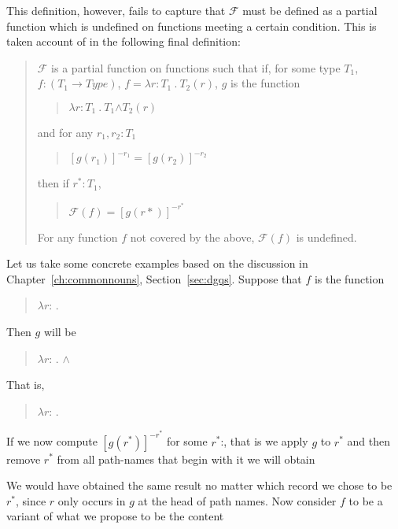 This definition, however, fails to capture that $\mathcal{F}$ must be
defined as a partial function which is undefined on functions meeting
a certain condition.  This is taken account of in the following final
definition:
\begin{quote}
$\mathcal{F}$ is a partial function on functions such that if, for
some type $T_1$, $f:(T_1\rightarrow \textit{Type})$, $f=\lambda
r\!:\!T_1\ .\ T_2(r)$, $g$ is the function
\begin{quote}
$\lambda r\!:\!T_1\ .\ T_1$\d{$\wedge$}$T_2(r)$
\end{quote}
and for any $r_1,r_2:T_1$
\begin{quote}
$[g(r_1)]^{-r_1} = [g(r_2)]^{-r_2}$
\end{quote}
then if $r^*:T_1$,
\begin{quote}
$\mathcal{F}(f) = [g(r*)]^{-r^*}$
\end{quote}

For any function $f$ not covered by the above, $\mathcal{F}(f)$ is undefined.
\end{quote}
Let us take some concrete examples based on the discussion in
Chapter~\ref{ch:commonnouns}, Section~\ref{sec:dgqs}.  Suppose that
$f$ is the function
\begin{quote}
$\lambda r$:
  . 
\end{quote}
Then $g$ will be
\begin{quote}
$\lambda r$:
  .  \d{$\wedge$} 
\end{quote}
That is,
\begin{quote}
$\lambda r$:
. 
\end{quote}
If we now compute $[g(r^*)]^{-r^*}$ for some
$r^*$:, that is we apply
$g$ to $r^*$ and then remove $r^*$ from all path-names that begin with
it we will obtain
\begin{quote}
\end{quote}
We would have obtained the same result no matter which record we chose
to be $r^*$, since $r$ only occurs in $g$ at the head of path names.
Now consider $f$ to be a variant of what we propose to be the content
